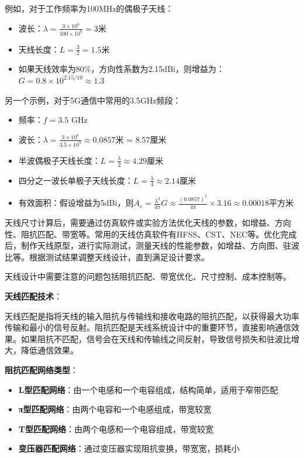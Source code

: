 \documentclass[12pt,UTF8]{ctexbook}
\begin{document}
例如，对于工作频率为100MHz的偶极子天线：
\begin{itemize}[leftmargin=3.5em]
    \item 波长：$\lambda = \frac{3\times10^8}{100\times10^6} = 3$米
    \item 天线长度：$L = \frac{3}{2} = 1.5$米
    \item 如果天线效率为80\%，方向性系数为2.15dBi，则增益为：$G = 0.8 \times 10^{2.15/10} \approx 1.3$
\end{itemize}

另一个示例，对于5G通信中常用的3.5GHz频段：
\begin{itemize}[leftmargin=3.5em]
    \item 频率：$f = 3.5$ GHz
    \item 波长：$\lambda = \frac{3\times10^8}{3.5\times10^9} \approx 0.0857$米 = 8.57厘米
    \item 半波偶极子天线长度：$L = \frac{\lambda}{2} \approx 4.29$厘米
    \item 四分之一波长单极子天线长度：$L = \frac{\lambda}{4} \approx 2.14$厘米
    \item 有效面积：假设增益为5dBi，则$A_e = \frac{\lambda^2}{4\pi}G \approx \frac{(0.0857)^2}{4\pi} \times 3.16 \approx 0.00018$平方米
\end{itemize}

天线尺寸计算后，需要通过仿真软件或实验方法优化天线的参数，如增益、方向性、阻抗匹配、带宽等。常用的天线仿真软件有HFSS、CST、NEC等。优化完成后，制作天线原型，进行实际测试，测量天线的性能参数，如增益、方向图、驻波比等。根据测试结果调整天线设计，直到满足设计要求。

天线设计中需要注意的问题包括阻抗匹配、带宽优化、尺寸控制、成本控制等。

\textbf{天线匹配技术}：

天线匹配是指将天线的输入阻抗与传输线和接收电路的阻抗匹配，以获得最大功率传输和最小的信号反射。阻抗匹配是天线系统设计中的重要环节，直接影响通信效果。如果阻抗不匹配，信号会在天线和传输线之间反射，导致信号损失和驻波比增大，降低通信效果。

\textbf{阻抗匹配网络类型}：
\begin{itemize}[leftmargin=3.5em]
    \item \textbf{L型匹配网络}：由一个电感和一个电容组成，结构简单，适用于窄带匹配
    \item \textbf{π型匹配网络}：由两个电容和一个电感组成，带宽较宽
    \item \textbf{T型匹配网络}：由两个电感和一个电容组成，带宽较宽
    \item \textbf{变压器匹配网络}：通过变压器实现阻抗变换，带宽宽，损耗小
\end{itemize}
\end{document}
